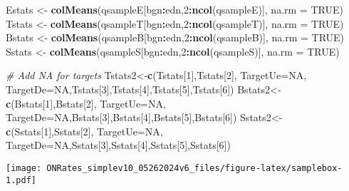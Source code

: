 \documentclass[
]{article}
\newenvironment{Shaded}{\begin{snugshade}}{\end{snugshade}}
\newcommand{\AttributeTok}[1]{\textcolor[rgb]{0.13,0.29,0.53}{#1}}
\newcommand{\CommentTok}[1]{\textcolor[rgb]{0.56,0.35,0.01}{\textit{#1}}}
\newcommand{\ConstantTok}[1]{\textcolor[rgb]{0.56,0.35,0.01}{#1}}
\newcommand{\DecValTok}[1]{\textcolor[rgb]{0.00,0.00,0.81}{#1}}
\newcommand{\FunctionTok}[1]{\textcolor[rgb]{0.13,0.29,0.53}{\textbf{#1}}}
\newcommand{\NormalTok}[1]{#1}
\newcommand{\OtherTok}[1]{\textcolor[rgb]{0.56,0.35,0.01}{#1}}
\newcommand{\SpecialCharTok}[1]{\textcolor[rgb]{0.81,0.36,0.00}{\textbf{#1}}}
\let\origfigure\figure
\let\endorigfigure\endfigure
\renewenvironment{figure}[1][2] {
    \expandafter\origfigure\expandafter[H]
} {
    \endorigfigure
}
\begin{document}
\begin{Shaded}
\begin{Highlighting}[]
\NormalTok{Estats }\OtherTok{\textless{}{-}} \FunctionTok{colMeans}\NormalTok{(qsampleE[bgn}\SpecialCharTok{:}\NormalTok{edn,}\DecValTok{2}\SpecialCharTok{:}\FunctionTok{ncol}\NormalTok{(qsampleE)], }\AttributeTok{na.rm =} \ConstantTok{TRUE}\NormalTok{)}
\NormalTok{Tstats }\OtherTok{\textless{}{-}} \FunctionTok{colMeans}\NormalTok{(qsampleT[bgn}\SpecialCharTok{:}\NormalTok{edn,}\DecValTok{2}\SpecialCharTok{:}\FunctionTok{ncol}\NormalTok{(qsampleT)], }\AttributeTok{na.rm =} \ConstantTok{TRUE}\NormalTok{)}
\NormalTok{Bstats }\OtherTok{\textless{}{-}} \FunctionTok{colMeans}\NormalTok{(qsampleB[bgn}\SpecialCharTok{:}\NormalTok{edn,}\DecValTok{2}\SpecialCharTok{:}\FunctionTok{ncol}\NormalTok{(qsampleB)], }\AttributeTok{na.rm =} \ConstantTok{TRUE}\NormalTok{)}
\NormalTok{Sstats }\OtherTok{\textless{}{-}} \FunctionTok{colMeans}\NormalTok{(qsampleS[bgn}\SpecialCharTok{:}\NormalTok{edn,}\DecValTok{2}\SpecialCharTok{:}\FunctionTok{ncol}\NormalTok{(qsampleS)], }\AttributeTok{na.rm =} \ConstantTok{TRUE}\NormalTok{)}

\CommentTok{\# Add NA for targets }
\NormalTok{Tstats2}\OtherTok{\textless{}{-}}\FunctionTok{c}\NormalTok{(Tstats[}\DecValTok{1}\NormalTok{],Tstats[}\DecValTok{2}\NormalTok{], }\AttributeTok{TargetUe=}\ConstantTok{NA}\NormalTok{, }\AttributeTok{TargetDe=}\ConstantTok{NA}\NormalTok{,Tstats[}\DecValTok{3}\NormalTok{],Tstats[}\DecValTok{4}\NormalTok{],Tstats[}\DecValTok{5}\NormalTok{],Tstats[}\DecValTok{6}\NormalTok{])}
\NormalTok{Bstats2}\OtherTok{\textless{}{-}}\FunctionTok{c}\NormalTok{(Bstats[}\DecValTok{1}\NormalTok{],Bstats[}\DecValTok{2}\NormalTok{], }\AttributeTok{TargetUe=}\ConstantTok{NA}\NormalTok{, }\AttributeTok{TargetDe=}\ConstantTok{NA}\NormalTok{,Bstats[}\DecValTok{3}\NormalTok{],Bstats[}\DecValTok{4}\NormalTok{],Bstats[}\DecValTok{5}\NormalTok{],Bstats[}\DecValTok{6}\NormalTok{])}
\NormalTok{Sstats2}\OtherTok{\textless{}{-}}\FunctionTok{c}\NormalTok{(Sstats[}\DecValTok{1}\NormalTok{],Sstats[}\DecValTok{2}\NormalTok{], }\AttributeTok{TargetUe=}\ConstantTok{NA}\NormalTok{, }\AttributeTok{TargetDe=}\ConstantTok{NA}\NormalTok{,Sstats[}\DecValTok{3}\NormalTok{],Sstats[}\DecValTok{4}\NormalTok{],Sstats[}\DecValTok{5}\NormalTok{],Sstats[}\DecValTok{6}\NormalTok{])}
\end{Highlighting}
\end{Shaded}

\begin{figure}
\centering
\texttt{[image: ONRates\_simplev10\_05262024v6\_files/figure-latex/samplebox-1.pdf]}
\caption{\label{fig:samplebox}EFFR IQR and range of the sample 3/4/2016-12/14/2023}
\end{figure}
\end{document}
